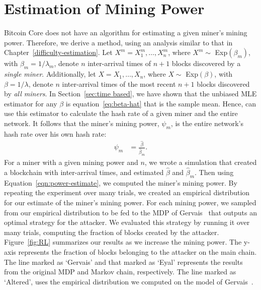 \section{Estimation of Mining Power}
Bitcoin Core does not have an algorithm for estimating a given miner's mining power. Therefore, we derive a method, using an analysis similar to that in Chapter~\ref{difficulty-estimation}.
Let $X^m = X_1^m, \dots, X_{n}^m$, where $X^m \sim$ Exp$(\beta_m)$, with $\beta_m = 1/\lambda_m$, denote $n$ inter-arrival times of $n+1$ blocks discovered by a {\em single miner}. Additionally, let $X = X_1, \dots, X_{n}$, where $X \sim$ Exp$(\beta)$, with $\beta = 1/\lambda$, denote $n$ inter-arrival times of the most recent $n+1$ blocks discovered by {\em all miners}.
In Section~\ref{sec:time based}, we have shown that the unbiased MLE estimator for any $\beta$ is equation~\ref{eq:beta-hat} that is the sample mean. Hence, can use this estimator to calculate the hash rate of a given miner and the entire network. It follows that the miner's mining power, $\psi_m$, is the entire network's hash rate over his own hash rate:
\begin{align}
\psi_m &= \frac{\hat{\beta}}{\hat{\beta}_m}.\label{eqn:power-estimate}
\end{align} 
 For a miner with a given mining power and $n$, we wrote a simulation that created a blockchain with inter-arrival times, and estimated $\hat{\beta}$ and $\hat{\beta}_m$. Then using Equation~\ref{eqn:power-estimate}, we computed the miner's mining power. By repeating the experiment over many trials, we created an empirical distribution for our estimate of the miner's mining power. For each mining power, we sampled from our empirical distribution to be fed to the MDP of Gervais~\cite{Gervais:2016} that outputs an optimal strategy for the attacker. We evaluated this strategy by running it over many trials, computing the fraction of blocks created by the attacker. Figure~\ref{fig:RL} summarizes our results as we increase the mining power. The y-axis represents the fraction of blocks belonging to the attacker on the main chain. The line marked as `Gervais' and that marked as `Eyal' represents the results from the original MDP and Markov chain, respectively. The line marked as `Altered', uses the empirical distribution we computed on the model of Gervais~\cite{Gervais:2016}. 

